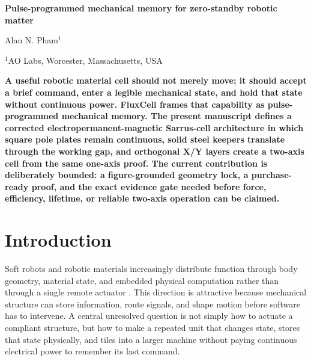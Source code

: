 \documentclass[12pt,letterpaper]{article}
\newcommand{\fluxcell}{FluxCell}
\begin{document}
\linenumbers
\thispagestyle{empty}

\begin{center}
    \vspace*{-0.6em}

    {\fontsize{20}{22}\selectfont\bfseries\color{SumiInk}
    Pulse-programmed mechanical memory for zero-standby robotic matter\par}

    \vspace{0.95em}

    {\normalsize\color{SumiInk}
    Alan N. Pham$^{1}$\par}

    \vspace{0.38em}

    {\small\color{DustyTaupe}
    $^{1}$AO Labs, Worcester, Massachusetts, USA\par}
\end{center}

\vspace{0.35em}
\noindent\textbf{A useful robotic material cell should not merely move; it should accept a brief command, enter a legible mechanical state, and hold that state without continuous power. \fluxcell{} frames that capability as pulse-programmed mechanical memory. The present manuscript defines a corrected electropermanent-magnetic Sarrus-cell architecture in which square pole plates remain continuous, solid steel keepers translate through the working gap, and orthogonal X/Y layers create a two-axis cell from the same one-axis proof. The current contribution is deliberately bounded: a figure-grounded geometry lock, a purchase-ready proof, and the exact evidence gate needed before force, efficiency, lifetime, or reliable two-axis operation can be claimed.}

\newpage
\pagestyle{fancy}

\section{Introduction}

Soft robots and robotic materials increasingly distribute function through body geometry, material state, and embedded physical computation rather than through a single remote actuator \cite{rus2015,wehner2016,byun2024}. This direction is attractive because mechanical structure can store information, route signals, and shape motion before software has to intervene. A central unresolved question is not simply how to actuate a compliant structure, but how to make a repeated unit that changes state, stores that state physically, and tiles into a larger machine without paying continuous electrical power to remember its last command.
\end{document}
